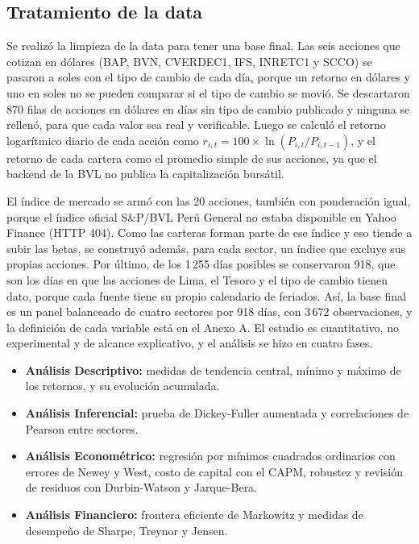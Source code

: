 \documentclass[jrfm,article,submit,oneauthor]{Definitions/mdpi}
\begin{document}
\subsection{Tratamiento de la data}
Se realizó la limpieza de la data para tener una base final. Las seis acciones que cotizan en dólares (BAP, BVN, CVERDEC1, IFS, INRETC1 y SCCO) se pasaron a soles con el tipo de cambio de cada día, porque un retorno en dólares y uno en soles no se pueden comparar si el tipo de cambio se movió. Se descartaron 870 filas de acciones en dólares en días sin tipo de cambio publicado y ninguna se rellenó, para que cada valor sea real y verificable. Luego se calculó el retorno logarítmico diario de cada acción como $r_{i,t} = 100 \times \ln(P_{i,t}/P_{i,t-1})$, y el retorno de cada cartera como el promedio simple de sus acciones, ya que el backend de la BVL no publica la capitalización bursátil.

El índice de mercado se armó con las 20 acciones, también con ponderación igual, porque el índice oficial S\&P/BVL Perú General no estaba disponible en Yahoo Finance (HTTP 404). Como las carteras forman parte de ese índice y eso tiende a subir las betas, se construyó además, para cada sector, un índice que excluye sus propias acciones. Por último, de los 1\,255 días posibles se conservaron 918, que son los días en que las acciones de Lima, el Tesoro y el tipo de cambio tienen dato, porque cada fuente tiene su propio calendario de feriados. Así, la base final es un panel balanceado de cuatro sectores por 918 días, con 3\,672 observaciones, y la definición de cada variable está en el Anexo A. El estudio es cuantitativo, no experimental y de alcance explicativo, y el análisis se hizo en cuatro fases.

\begin{itemize}
\item \textbf{Análisis Descriptivo:} medidas de tendencia central, mínimo y máximo de los retornos, y su evolución acumulada.
\item \textbf{Análisis Inferencial:} prueba de Dickey-Fuller aumentada y correlaciones de Pearson entre sectores.
\item \textbf{Análisis Econométrico:} regresión por mínimos cuadrados ordinarios con errores de Newey y West, costo de capital con el CAPM, robustez y revisión de residuos con Durbin-Watson y Jarque-Bera.
\item \textbf{Análisis Financiero:} frontera eficiente de Markowitz y medidas de desempeño de Sharpe, Treynor y Jensen.
\end{itemize}
\end{document}
